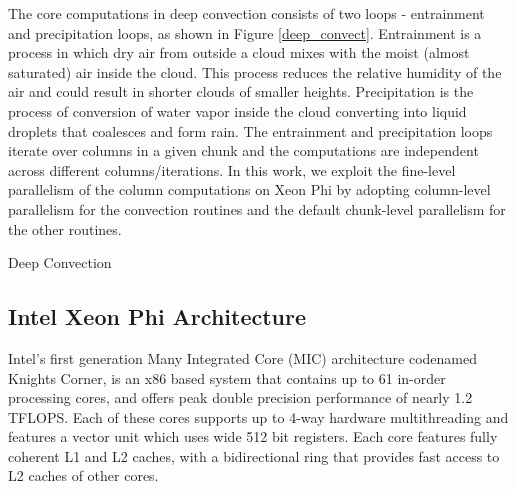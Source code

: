 The  core computations in deep convection consists of two loops - entrainment and precipitation loops, as shown in Figure \ref{deep_convect}.
Entrainment is a process in which dry air from outside a cloud mixes with the moist (almost saturated) air inside the cloud. This process reduces the relative humidity of the air and could result in shorter clouds of smaller heights. Precipitation is the process of conversion of water vapor inside the cloud converting into liquid droplets that coalesces and form rain. The entrainment and precipitation loops iterate over columns in a given chunk and the computations are independent across different columns/iterations. 
In this work, we exploit the fine-level parallelism of the column computations on Xeon Phi by adopting column-level parallelism for the convection routines and the default chunk-level parallelism for the other routines.

\begin{algorithm}
\begin{small}

  \BlankLine


\caption{Deep Convection}
\label{deep_convect}
\end{small}
\end{algorithm}

\subsection{Intel Xeon Phi Architecture}

Intel's first generation Many Integrated Core (MIC) architecture codenamed Knights Corner, is an x86 based system that contains up to 61 in-order processing cores, and offers peak double precision performance of nearly 1.2 TFLOPS. Each of these cores supports up to 4-way hardware multithreading and features a vector unit which uses wide 512 bit registers. Each core features fully coherent L1 and L2 caches, with a bidirectional ring that provides fast access to L2 caches of other cores.

